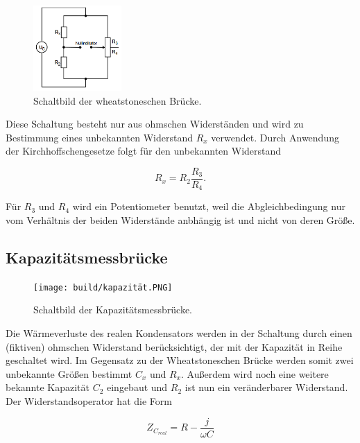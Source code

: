 \begin{figure}[H]
    \centering
    \includegraphics[width=0.3\textwidth]{build/wheat.PNG}
    \caption{Schaltbild der wheatstoneschen Brücke.\cite[219]{V302}}
    \label{fig:wheat}
\end{figure}

Diese Schaltung besteht nur aus ohmschen Widerständen und wird zu Bestimmung eines unbekannten Widerstand $R_x$ verwendet.
Durch Anwendung der Kirchhoffschengesetze folgt für den unbekannten Widerstand

\begin{equation}
    R_x = R_2 \frac{R_3}{R_4}.
    \label{eqn:wheat}
\end{equation}

Für $R_3$ und $R_4$ wird ein Potentiometer benutzt, weil die Abgleichbedingung nur vom Verhältnis der beiden Widerstände anbhängig ist und nicht von deren Größe.

\subsection{Kapazitätsmessbrücke}
\label{subsec:kapazitäts}

\begin{figure}[H]
    \centering
    \texttt{[image: build/kapazität.PNG]}
    \caption{Schaltbild der Kapazitätsmessbrücke.\cite[220]{V302}}
    \label{fig:kapazität}
\end{figure}

Die Wärmeverluste des realen Kondensators werden in der Schaltung durch einen (fiktiven) ohmschen Widerstand berücksichtigt, der mit der Kapazität in Reihe geschaltet wird.
Im Gegensatz zu der Wheatstoneschen Brücke werden somit zwei unbekannte Größen bestimmt $C_x$ und $R_x$.
Außerdem wird noch eine weitere bekannte Kapazität $C_2$ eingebaut und $R_2$ ist nun ein veränderbarer Widerstand.
Der Widerstandsoperator hat die Form

\begin{equation}
    Z_{C_{real}} = R - \frac{j}{\omega C}
    \label{eqn:widerop_kap}
\end{equation}

